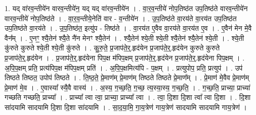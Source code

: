 \documentclass[17pt]{extarticle}
\begin{document}
1. यद् वा॑रव॒न्तीये॑न वारव॒न्तीये॑न॒ यद् यद् वा॑रव॒न्तीये॑न । . वा॒र॒व॒न्तीये॑ नोप॒तिष्ठ॑त उप॒तिष्ठ॑ते वारव॒न्तीये॑न वारव॒न्तीये॑ नोप॒तिष्ठ॑ते । . वा॒र॒व॒न्तीये॒नेति॑ वार - व॒न्तीये॑न । . उ॒प॒तिष्ठ॑ते वा॒रय॑ते वा॒रय॑त उप॒तिष्ठ॑त उप॒तिष्ठ॑ते वा॒रय॑ते । . उ॒प॒तिष्ठ॑त॒ इत्यु॑प - तिष्ठ॑ते । . वा॒रय॑त ए॒वैव वा॒रय॑ते वा॒रय॑त ए॒व । . ए॒वैन॑ मेन मे॒वै वैन᳚म् । . ए॒नꣳ॒॒ श्यै॒तेन॑ श्यै॒ते नै॑न मेनꣳ श्यै॒तेन॑ । . श्यै॒तेन॑ श्ये॒ती श्ये॒ती श्यै॒तेन॑ श्यै॒तेन॑ श्ये॒ती । . श्ये॒ती कु॑रुते कुरुते श्ये॒ती श्ये॒ती कु॑रुते । . कु॒रु॒ते॒ प्र॒जाप॑ते॒र्॒.हृद॑येन प्र॒जाप॑ते॒र्॒.हृद॑येन कुरुते कुरुते प्र॒जाप॑ते॒र्॒.हृद॑येन । . प्र॒जाप॑ते॒र्॒.हृद॑येना पिप॒क्ष म॑पिप॒क्षम् प्र॒जाप॑ते॒र्॒.हृद॑येन प्र॒जाप॑ते॒र्॒.हृद॑येना पिप॒क्षम् । . अ॒पि॒प॒क्षम् प्रति॒ प्रत्य॑पिप॒क्ष म॑पिप॒क्षम् प्रति॑ । . अ॒पि॒प॒क्षमित्य॑पि - प॒क्षम् । . प्रत्युपोप॒ प्रति॒ प्रत्युप॑ । . उप॑ तिष्ठते तिष्ठत॒ उपोप॑ तिष्ठते । . ति॒ष्ठ॒ते॒ प्रे॒माण॑म् प्रे॒माण॑म् तिष्ठते तिष्ठते प्रे॒माण᳚म् । . प्रे॒माण॑ मे॒वैव प्रे॒माण॑म् प्रे॒माण॑ मे॒व । . ए॒वास्या᳚ स्यै॒वै वास्य॑ । . अ॒स्य॒ ग॒च्छ॒ति॒ ग॒च्छ॒ त्य॒स्या॒स्य॒ ग॒च्छ॒ति॒ । . ग॒च्छ॒ति॒ प्राच्या॒ प्राच्या॑ गच्छति गच्छति॒ प्राच्या᳚ । . प्राच्या᳚ त्वा त्वा॒ प्राच्या॒ प्राच्या᳚ त्वा । . त्वा॒ दि॒शा दि॒शा त्वा᳚ त्वा दि॒शा । . दि॒शा सा॑दयामि सादयामि दि॒शा दि॒शा सा॑दयामि । . सा॒द॒या॒मि॒ गा॒य॒त्रेण॑ गाय॒त्रेण॑ सादयामि सादयामि गाय॒त्रेण॑ । \newline
\end{document}
